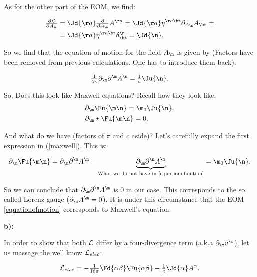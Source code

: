 As for the other part of the EOM, we find:

\begin{equation}
	\begin{split}
		\tfrac{\partial \matL}{\partial \vad{n}} &= \Jd{\aa} \tfrac{\partial}{\partial \vad{\n}} \vau{\aa} = \Jd{\aa} \metu{\aa\bt} \pd{\vad{\n}} \vad{\bt} = \\
		&=  \Jd{\aa} \metu{\aa\bt} \deltita{\n}{\bt}  = \Jd{\n}. 
	\end{split}
\end{equation}

So we find that the equation of motion for the field $\vad{\n}$ is given by (Factors have been removed from previous calculations. One has to introduce them back):

\begin{equation}\label{equationofmotion}
	\tfrac{1}{4\pi} \pd{\m}\pu{\m}\vau{\n} = \tfrac{1}{c} \Ju{\n}.
\end{equation}

So, Does this look like Maxwell equations? Recall how they look like:
\begin{equation}\label{maxwell}
	\begin{split}
		&\pd{\m}\Fu{\m\n} = \m_{0} \Ju{\n},\\
		&\pd{\m} \star \Fu{\m\n} =0.\\
	\end{split}
\end{equation}

And what do we have (factors of $\pi$ and $c$ aside)? Let's carefully expand the first expression in (\ref{maxwell}). This is:

\begin{equation}
	\pd{\m}\Fu{\m\n} = \pd{\m}\pu{\m}\vau{\n} - \underbrace{\pd{\m}\pu{\n}\vau{\m}}_{\text{What we do not have in \ref{equationofmotion}}}= \m_{0} \Ju{\n}.
\end{equation}

So we can conclude that $\pd{\m}\pu{\n}\vau{\m}$ is 0 in our case. This corresponds to the so called Lorenz gauge ($\pd{\m}\vau{\m}=0$). It is under this circumstance that the EOM \ref{equationofmotion} corresponds to Maxwell's equation.

\textbf{b):}

In order to show that both $\mathcal{L}$ differ by a four-divergence term (a.k.a $\pd{\m} v^{\m}$), let us massage the well know $\mathcal{L}_{elec}$:

\begin{equation}
	\matL_{elec} = -\tfrac{1}{16 \pi} \Fd{\alpha\beta} \Fu{\alpha\beta} - \tfrac{1}{c} \Jd{\alpha}\vau{\alpha}.
\end{equation}


